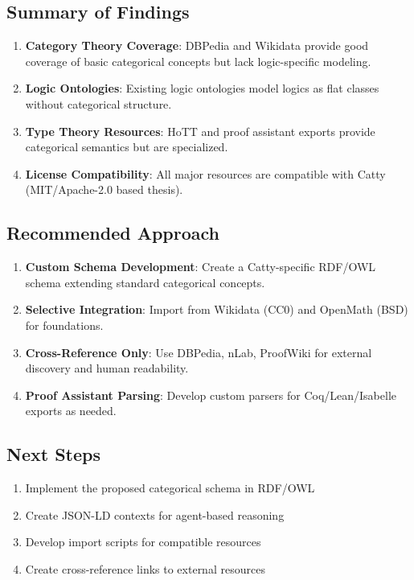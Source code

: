 \subsection{Summary of Findings}

\begin{enumerate}
  \item \textbf{Category Theory Coverage}: DBPedia and Wikidata provide good coverage of basic categorical concepts but lack logic-specific modeling.
  \item \textbf{Logic Ontologies}: Existing logic ontologies model logics as flat classes without categorical structure.
  \item \textbf{Type Theory Resources}: HoTT and proof assistant exports provide categorical semantics but are specialized.
  \item \textbf{License Compatibility}: All major resources are compatible with Catty (MIT/Apache-2.0 based thesis).
\end{enumerate}

\subsection{Recommended Approach}

\begin{enumerate}
  \item \textbf{Custom Schema Development}: Create a Catty-specific RDF/OWL schema extending standard categorical concepts.
  \item \textbf{Selective Integration}: Import from Wikidata (CC0) and OpenMath (BSD) for foundations.
  \item \textbf{Cross-Reference Only}: Use DBPedia, nLab, ProofWiki for external discovery and human readability.
  \item \textbf{Proof Assistant Parsing}: Develop custom parsers for Coq/Lean/Isabelle exports as needed.
\end{enumerate}

\subsection{Next Steps}

\begin{enumerate}
  \item Implement the proposed categorical schema in RDF/OWL
  \item Create JSON-LD contexts for agent-based reasoning
  \item Develop import scripts for compatible resources
  \item Create cross-reference links to external resources
\end{enumerate}
